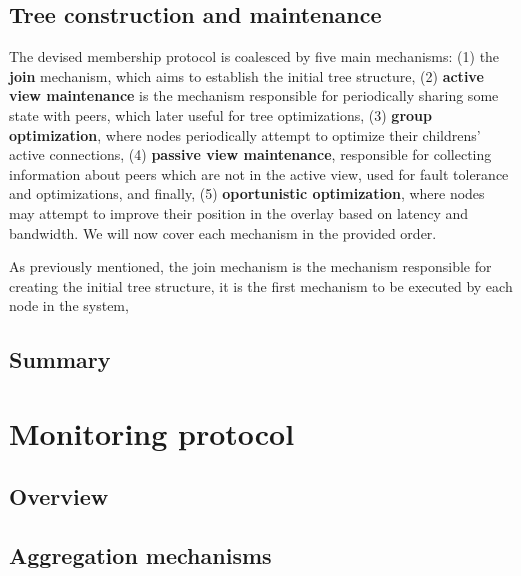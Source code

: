 \subsection{Tree construction and maintenance}

The devised membership protocol is coalesced by five main mechanisms: (1) the \textbf{join} mechanism, which aims to establish the initial tree structure, (2) \textbf{active view maintenance} is the mechanism responsible for periodically sharing some state with peers, which later useful for tree optimizations, (3) \textbf{group optimization}, where nodes periodically attempt to optimize their childrens' active connections, (4) \textbf{passive view maintenance}, responsible for collecting information about peers which are not in the active view, used for fault tolerance and optimizations, and finally, (5) \textbf{oportunistic optimization}, where nodes may attempt to improve their position in the overlay based on latency and bandwidth. We will now cover each mechanism in the provided order.

As previously mentioned, the join mechanism is the mechanism responsible for creating the initial tree structure, it is the first mechanism to be executed by each node in the system, 









\subsection{Summary}

\section{Monitoring protocol}

\subsection{Overview}

\subsection{Aggregation mechanisms}

